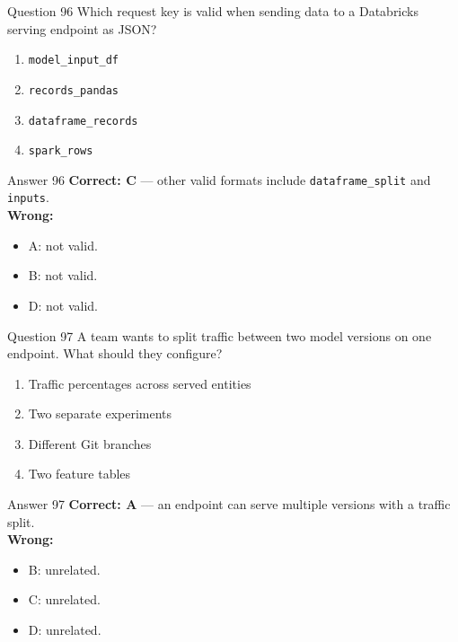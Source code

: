 \documentclass[aspectratio=169,11pt]{beamer}
\begin{document}
	\begin{frame}{Question 96}
		Which request key is valid when sending data to a Databricks serving endpoint as JSON?
		\begin{enumerate}[label=\Alph*.]
			\item \texttt{model\_input\_df}
			\item \texttt{records\_pandas}
			\item \texttt{dataframe\_records}
			\item \texttt{spark\_rows}
		\end{enumerate}
	\end{frame}
	\begin{frame}{Answer 96}
		\textbf{Correct: C} --- other valid formats include \texttt{dataframe\_split} and \texttt{inputs}.\\
		\vspace{0.5em}
		\textbf{Wrong:}
		\begin{itemize}
			\item A: not valid.
			\item B: not valid.
			\item D: not valid.
		\end{itemize}
	\end{frame}
	
	\begin{frame}{Question 97}
		A team wants to split traffic between two model versions on one endpoint. What should they configure?
		\begin{enumerate}[label=\Alph*.]
			\item Traffic percentages across served entities
			\item Two separate experiments
			\item Different Git branches
			\item Two feature tables
		\end{enumerate}
	\end{frame}
	\begin{frame}{Answer 97}
		\textbf{Correct: A} --- an endpoint can serve multiple versions with a traffic split.\\
		\vspace{0.5em}
		\textbf{Wrong:}
		\begin{itemize}
			\item B: unrelated.
			\item C: unrelated.
			\item D: unrelated.
		\end{itemize}
	\end{frame}
	
\end{document}
